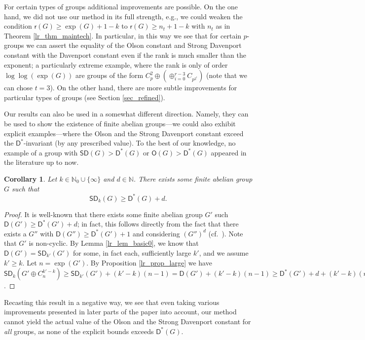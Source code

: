 \documentclass{amsart}
\newtheorem{co}[thm]{Corollary}
\theoremstyle{definition}
\numberwithin{equation}{section}
\begin{document}
For certain types of groups additional improvements are possible.
On the one hand, we did not use our method in its full strength, e.g., we could weaken the condition $\mathsf{r}(G)\ge \exp(G)+1-k$ to $\mathsf{r}(G)\ge n_t+1-k$ with $n_t$ as in Theorem \ref{lr_thm_maintech}.
In particular, in this way we see that for certain $p$-groups we can assert the equality of
the Olson constant and Strong Davenport constant with the Davenport constant even if the rank is much smaller than the exponent; a particularly extreme example, where the rank is only of order $\log\log (\exp(G))$ are groups of the form $C_p^2\oplus  (\oplus_{i=0}^{r-3}C_{p^{2^i}})$ (note that we can chose $t=3$).
On the other hand, there are more subtle improvements for particular types of groups (see Section \ref{sec_refined}).

Our results can also be used in a somewhat different direction. Namely, they can be used to show the existence of finite abelian groups---we could also exhibit explicit examples---where the Olson and the Strong Davenport constant
exceed the ${\mathsf{D}^{\ast}}$-invariant (by any prescribed value). To the best of our knowledge, no example of a group
with  ${\mathsf{SD}}(G)> {\mathsf{D}^{\ast}}(G)$ or ${\mathsf{O}}(G)> {\mathsf{D}^{\ast}}(G)$ appeared in the literature up to now.

\begin{co}
\label{co_excess}
Let $k \in \mathbb{N}_0 \cup \{\infty \}$ and $d \in \mathbb{N}$. There exists some finite abelian group $G$ such that
\[{\mathsf{SD}}_k(G) \ge {\mathsf{D}^{\ast}}(G)+d.\]
\end{co}
\begin{proof}
It is well-known that there exists some finite abelian group $G'$ such
${\mathsf{D}}(G') \ge {\mathsf{D}^{\ast}}(G')+ d$; in fact, this follows directly from the fact that there exists a
$G''$ with ${\mathsf{D}}(G'') \ge {\mathsf{D}^{\ast}}(G')+ 1$ and considering $(G'')^d$ (cf.~\cite[Section 3]{GaoGe1}).
Note that $G'$ is non-cyclic. By Lemma \ref{lr_lem_basic0}, we know that
${\mathsf{D}}(G')= {\mathsf{SD}}_{k'}(G')$ for some, in fact each, sufficiently large $k'$, and we assume $k' \ge k$.
Let $n= \exp(G')$. By Proposition \ref{lr_prop_large} we have ${\mathsf{SD}}_k(G' \oplus C_n^{k' - k})\ge {\mathsf{SD}}_{k'}(G')+ (k' -k)(n-1)= {\mathsf{D}}(G')+(k' -k)(n-1) \ge {\mathsf{D}^{\ast}}(G')+d+ (k' -k)(n-1) = {\mathsf{D}^{\ast}}(G' \oplus C_n^{k' - k})+d$.
\end{proof}

Recasting this result in a negative way, we see that even taking various improvements presented in later parts of the paper into account, our method cannot yield the actual value of the Olson and the Strong Davenport constant for \emph{all} groups, as none of the explicit bounds exceeds ${\mathsf{D}^{\ast}}(G)$.
\end{document}
